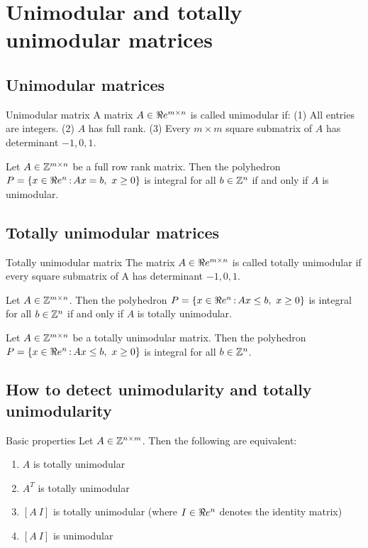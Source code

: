 \section{Unimodular and totally unimodular matrices}
\subsection{Unimodular matrices}

\begin{definition}{Unimodular matrix}{}
A matrix $A\in\Re e^{m\times n}$ is called unimodular if: (1) All entries are integers.
	(2) $A$ has full rank. (3) Every $m\times m$ square submatrix of $A$ has determinant $-1,0,1$.
\end{definition}

\begin{theorem}{}{} Let $A\in{\mathbb{Z}}^{m\times n}$ be a full row rank matrix. Then the polyhedron $P=\{x\in\Re e^n{\,:\,} Ax=b,\ x\geq 0\}$ is integral for all $b\in{\mathbb{Z}}^n$ if and only if $A$ is unimodular.
\end{theorem}



\subsection{Totally unimodular matrices}
\begin{definition}{Totally unimodular matrix}{}
The matrix $A\in\Re e^{m\times n}$ is called totally unimodular if every square submatrix
of A has determinant $-1,0,1$.
\end{definition}

\begin{theorem}{}{} Let $A\in{\mathbb{Z}}^{m\times n}$. Then the polyhedron $P=\{x\in\Re e^n{\,:\,} Ax\leq b,\ x\geq 0\}$ is integral for all $b\in{\mathbb{Z}}^n$ if and only if $A$ is totally unimodular.
\end{theorem}

\begin{theorem}{}{} Let $A\in{\mathbb{Z}}^{m\times n}$ be a totally unimodular matrix. Then the polyhedron $P=\{x\in\Re e^n{\,:\,} Ax\leq b,\ x\geq 0\}$ is integral for all $b\in{\mathbb{Z}}^n$.
\end{theorem}

\subsection{How to detect unimodularity and totally unimodularity}

\begin{theorem}{Basic properties}{} Let  $A\in{\mathbb{Z}}^{n\times m}$. Then the following are equivalent: 
\begin{enumerate}
	\item $A$ is totally unimodular
	\item $A^T$ is totally unimodular
	\item  $[A\ I]$ is totally unimodular (where $I\in \Re e^n$ denotes the identity matrix)
	\item $[A\ I]$ is unimodular
\end{enumerate}
\end{theorem}

